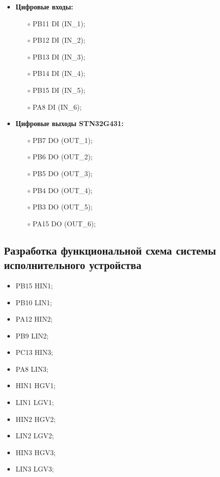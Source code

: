 \begin{itemize}
    \item \textbf{Цифровые входы:}
    \begin{itemize}
        \item[$\circ$] PB11 \leftarrow DI (IN\_1);
        \item[$\circ$] PB12 \leftarrow DI (IN\_2);
        \item[$\circ$] PB13 \leftarrow DI (IN\_3);
        \item[$\circ$] PB14 \leftarrow DI (IN\_4);
        \item[$\circ$] PB15 \leftarrow DI (IN\_5);
        \item[$\circ$] PA8 \leftarrow DI (IN\_6);
    \end{itemize}
    \item \textbf{Цифровые выходы STN32G431:}
    \begin{itemize}
        \item[$\circ$] PB7 \rightarrow DO (OUT\_1);
        \item[$\circ$] PB6 \rightarrow DO (OUT\_2);
        \item[$\circ$] PB5 \rightarrow DO (OUT\_3);
        \item[$\circ$] PB4 \rightarrow DO (OUT\_4);
        \item[$\circ$] PB3 \rightarrow DO (OUT\_5);
        \item[$\circ$] PA15 \rightarrow DO (OUT\_6);
    \end{itemize}
\end{itemize}

\subsection{Разработка функциональной схема системы исполнительного устройства}


\begin{itemize}
    \item PB15 \rightarrow HIN1;
    \item PB10 \rightarrow LIN1;
    \item PA12 \rightarrow HIN2;
    \item PB9 \rightarrow LIN2;
    \item PC13 \rightarrow HIN3;
    \item PA8 \rightarrow LIN3;
\end{itemize}

\begin{itemize}
    \item HIN1 \rightarrow HGV1;
    \item LIN1 \rightarrow LGV1;
    \item HIN2 \rightarrow HGV2;
    \item LIN2 \rightarrow LGV2;
    \item HIN3 \rightarrow HGV3;
    \item LIN3 \rightarrow LGV3;
\end{itemize}



